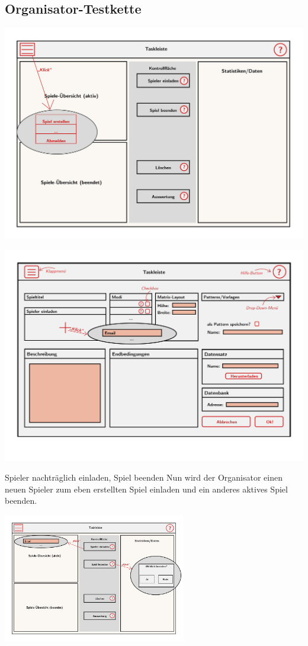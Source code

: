 \documentclass[xcolor=dvipsnames]{beamer}
\begin{document}
    \subsection{Organisator-Testkette}
    \begin{frame}
        \includegraphics[width=\textwidth]{img/OrganisatorPres.jpg}
    \end{frame}
    \begin{frame}
         \includegraphics[width=\textwidth]{img/Spielerstellung.jpg}
    \end{frame}
    \begin{frame}
        \begin{block} {Spieler nachträglich einladen, Spiel beenden}
            Nun wird der Organisator einen neuen Spieler zum eben erstellten Spiel einladen und ein anderes aktives Spiel beenden.
        \end{block}
        \centering
        \includegraphics[width=8cm]{img/OrganisatorPres2.jpg}
    \end{frame}
\end{document}

